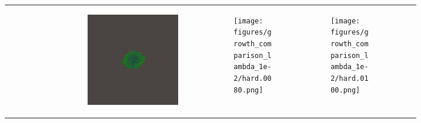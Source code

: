 \documentclass[conference]{IEEEtran}
\newlength{\subfigwidth}
\begin{document}
\begin{figure}
\begin{subfigure}[b]{\textwidth}
\begin{tabular}{r M{\subfigwidth} M{\subfigwidth} M{\subfigwidth} M{\subfigwidth} M{\subfigwidth} }
\begin{subfigure}[b]{\subfigwidth}
            \end{subfigure} &
            \begin{subfigure}[b]{\subfigwidth}
                \includegraphics[width=\textwidth]{figures/growth_comparison_lambda_1e-2/hard.0060.png}
            \end{subfigure} &
            \begin{subfigure}[b]{\subfigwidth}
                \texttt{[image: figures/growth\_comparison\_lambda\_1e-2/hard.0080.png]}
            \end{subfigure} &
            \begin{subfigure}[t]{\subfigwidth}
                \texttt{[image: figures/growth\_comparison\_lambda\_1e-2/hard.0100.png]}
            \end{subfigure}    \\


\end{tabular}
\end{subfigure}
\end{figure}
\end{document}
